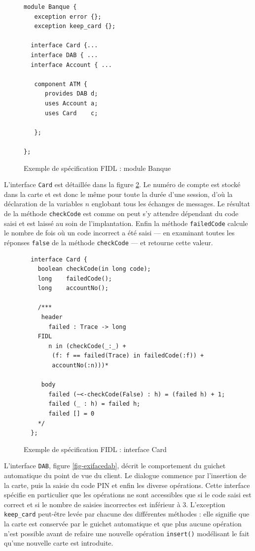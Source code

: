 \begin{figure}[htbp]
\begin{lstlisting}
module Banque {
   exception error {};
   exception keep_card {};

  interface Card {...
  interface DAB { ...
  interface Account { ...

   component ATM {
      provides DAB d;
      uses Account a;
      uses Card    c;
      
   };
   
};
\end{lstlisting}
\centering
    
    \caption{Exemple de sp\'ecification \textsf{FIDL} : module Banque}
    \label{fig-exbanque}
\end{figure}

L'interface \texttt{Card} est d\'etaill\'ee dans la figure
\ref{fig-exifacecard}. Le num\'ero de compte est
stock\'e dans la carte et est donc le m\^eme pour toute la
dur\'ee d'une session, d'o\`u la d\'eclaration de
la variables $n$ englobant tous les \'echanges de messages. Le r\'esultat de
la m\'ethode \texttt{checkCode} est comme on peut s'y attendre
d\'ependant du code \og saisi\fg{} et est laiss\'e au soin de
l'implantation. Enfin la m\'ethode \texttt{failedCode} calcule le
nombre  de fois o\`u un code incorrect a \'et\'e saisi --- en examinant
toutes les r\'eponses \texttt{false} de la m\'ethode
\texttt{checkCode} --- et retourne cette valeur.

\begin{figure}[htbp]
\begin{lstlisting}
  interface Card {
    boolean checkCode(in long code); 
    long    failedCode();
    long    accountNo();

    /*** 
     header
       failed : Trace -> long
    FIDL
       n in (checkCode(_:_) +
        (f: f == failed(Trace) in failedCode(:f)) +
        accountNo(:n)))*

     body
       failed (~<-checkCode(False) : h) = (failed h) + 1;
       failed (_ : h) = failed h;
       failed [] = 0
    */
  };
\end{lstlisting}
    \centering
    
    \caption{Exemple de sp\'ecification FIDL : interface Card}
    \label{fig-exifacecard}
\end{figure}


L'interface \texttt{DAB}, figure \ref{fig-exifacedab}, d\'ecrit le comportement du guichet
automatique du point de vue du client. Le dialogue commence par
l'insertion de la carte, puis la saisie du code PIN et enfin les
diverse op\'erations. Cette interface sp\'ecifie en particulier que
les op\'erations ne sont accessibles que si le code saisi est correct
et si le nombre de saisies incorrectes est inf\'erieur \`a
3. L'exception \verb+keep_card+ peut-\^etre lev\'ee par chacune des
diff\'erentes m\'ethodes : elle signifie que la carte est
conserv\'ee par le guichet automatique et que plus aucune
op\'eration n'est possible avant de refaire une nouvelle
op\'eration \texttt{insert()} mod\'elisant le fait qu'une nouvelle
carte est introduite.

